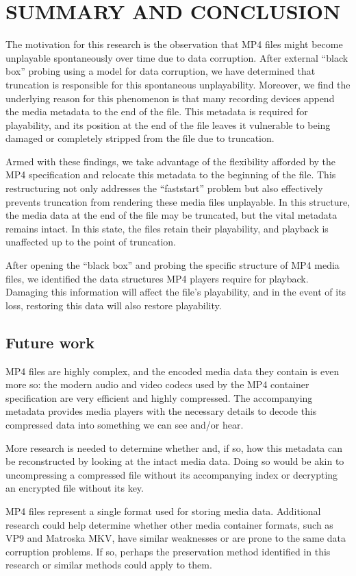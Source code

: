 
\chapter{\uppercase{Summary and Conclusion}}

The motivation for this research is the observation that MP4 files might become unplayable spontaneously over time due to data corruption. After external ``black box'' probing using a model for data corruption, we have determined that truncation is responsible for this spontaneous unplayability. Moreover, we find the underlying reason for this phenomenon is that many recording devices append the media metadata to the end of the file. This metadata is required for playability, and its position at the end of the file leaves it vulnerable to being damaged or completely stripped from the file due to truncation.

Armed with these findings, we take advantage of the flexibility afforded by the MP4 specification and relocate this metadata to the beginning of the file. This restructuring not only addresses the ``faststart'' problem but also effectively prevents truncation from rendering these media files unplayable. In this structure, the media data at the end of the file may be truncated, but the vital metadata remains intact. In this state, the files retain their playability, and playback is unaffected up to the point of truncation.

After opening the ``black box'' and probing the specific structure of MP4 media files, we identified the data structures MP4 players require for playback. Damaging this information will affect the file's playability, and in the event of its loss, restoring this data will also restore playability.

\section{Future work}

MP4 files are highly complex, and the encoded media data they contain is even more so: the modern audio and video codecs used by the MP4 container specification are very efficient and highly compressed. The accompanying metadata provides media players with the necessary details to decode this compressed data into something we can see and/or hear.

More research is needed to determine whether and, if so, how this metadata can be reconstructed by looking at the intact media data. Doing so would be akin to uncompressing a compressed file without its accompanying index or decrypting an encrypted file without its key.

MP4 files represent a single format used for storing media data. Additional research could help determine whether other media container formats, such as VP9 and Matroska MKV, have similar weaknesses or are prone to the same data corruption problems. If so, perhaps the preservation method identified in this research or similar methods could apply to them.